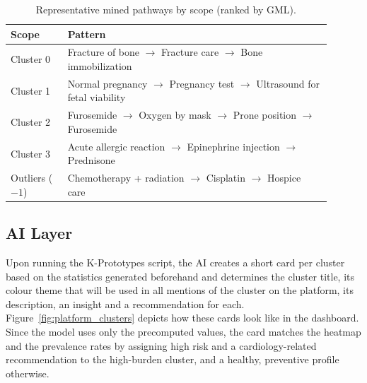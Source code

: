 \begin{table}[t]

\caption{Representative mined pathways by scope (ranked by GML).}

\label{tab:patterns}

\centering

\footnotesize

\begin{tabular}{@{}p{0.16\linewidth}p{0.74\linewidth}@{}}

\toprule

Scope & Pattern \\

\midrule

Cluster 0 & Fracture of bone $\rightarrow$ Fracture care $\rightarrow$ Bone immobilization \\

Cluster 1 & Normal pregnancy $\rightarrow$ Pregnancy test $\rightarrow$ Ultrasound for fetal viability \\

Cluster 2 & Furosemide $\rightarrow$ Oxygen by mask $\rightarrow$ Prone position $\rightarrow$ Furosemide \\

Cluster 3 & Acute allergic reaction $\rightarrow$ Epinephrine injection $\rightarrow$ Prednisone \\

Outliers ($-1$) & Chemotherapy + radiation $\rightarrow$ Cisplatin $\rightarrow$ Hospice care \\

\bottomrule

\end{tabular}

\end{table}

\subsection{AI Layer}

Upon running the K-Prototypes script, the AI creates a short card per cluster based on the statistics generated beforehand and determines the cluster title, its colour theme that will be used in all mentions of the cluster on the platform, its description, an insight and a recommendation for each. Figure~\ref{fig:platform_clusters} depicts how these cards look like in the dashboard. Since the model uses only the precomputed values, the card matches the heatmap and the prevalence rates by assigning high risk and a cardiology-related recommendation to the high-burden cluster, and a healthy, preventive profile otherwise.

